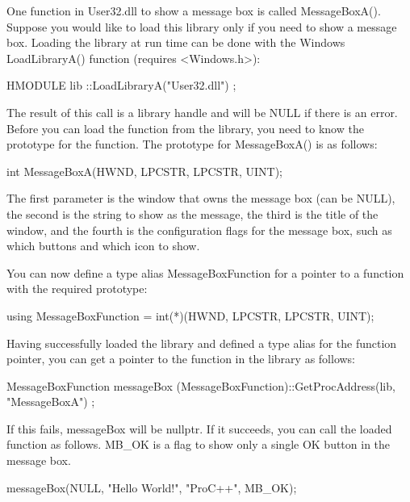 One function in User32.dll to show a message box is called MessageBoxA(). Suppose you would like to load this library only if you need to show a message box. Loading the library at run time can be done with the Windows LoadLibraryA() function (requires <Windows.h>):

\begin{cpp}
HMODULE lib { ::LoadLibraryA("User32.dll") };
\end{cpp}

The result of this call is a library handle and will be NULL if there is an error. Before you can load the function from the library, you need to know the prototype for the function. The prototype for MessageBoxA() is as follows:

\begin{cpp}
int MessageBoxA(HWND, LPCSTR, LPCSTR, UINT);
\end{cpp}

The first parameter is the window that owns the message box (can be NULL), the second is the string to show as the message, the third is the title of the window, and the fourth is the configuration flags for the message box, such as which buttons and which icon to show.

You can now define a type alias MessageBoxFunction for a pointer to a function with the required prototype:

\begin{cpp}
using MessageBoxFunction = int(*)(HWND, LPCSTR, LPCSTR, UINT);
\end{cpp}

Having successfully loaded the library and defined a type alias for the function pointer, you can get a pointer to the function in the library as follows:

\begin{cpp}
MessageBoxFunction messageBox {
    (MessageBoxFunction)::GetProcAddress(lib, "MessageBoxA") };
\end{cpp}

If this fails, messageBox will be nullptr. If it succeeds, you can call the loaded function as follows. MB\_OK is a flag to show only a single OK button in the message box.

\begin{cpp}
messageBox(NULL, "Hello World!", "ProC++", MB_OK);
\end{cpp}











